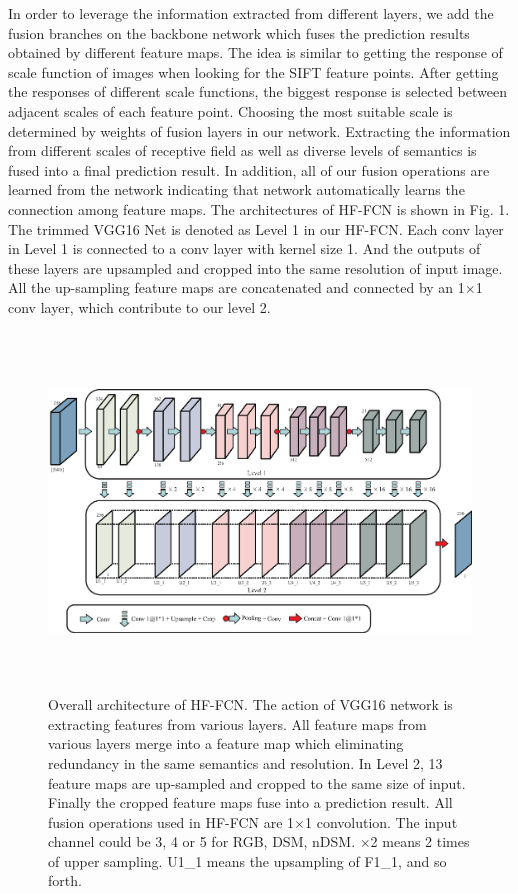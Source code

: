 In order to leverage the information extracted from different layers, we add the fusion branches on the backbone network which fuses the prediction results obtained by different feature maps. The idea is similar to getting the response of scale function of images when looking for the SIFT feature points. After getting the responses of different scale functions, the biggest response is selected between adjacent scales of each feature point. Choosing the most suitable scale is determined by weights of fusion layers in our network. Extracting the information from different scales of receptive field as well as diverse levels of semantics is fused into a final prediction result. In addition, all of our fusion operations are learned from the network indicating that network automatically learns the connection among feature maps. The architectures of HF-FCN is shown in Fig. 1. 
%
The trimmed VGG16 Net is denoted as Level 1 in our HF-FCN. Each conv layer in Level 1 is connected to a conv layer with kernel size 1. And the outputs of these layers are upsampled and cropped into the same resolution of input image. All the up-sampling feature maps are concatenated and connected  by an 1$\times$1 conv layer, which contribute to our level 2.



\begin{figure}
\centering
\includegraphics[width=18cm,height=9.5cm]{Figures/network_architecture.eps}
\centering
\caption{Overall architecture of HF-FCN. The action of VGG16 network is extracting features from various layers. All feature maps from various layers merge into a feature map which eliminating redundancy in the same semantics and resolution. In Level 2, 13 feature maps are up-sampled and cropped to the same size of input. Finally the cropped feature maps fuse into a prediction result. All fusion operations used in HF-FCN are 1$\times$1 convolution. The input channel could be 3, 4 or 5 for RGB, DSM, nDSM. $\times$2 means 2 times of upper sampling. U1\_1 means the upsampling of F1\_1, and so forth.  }
\label{3}
\end{figure} 


